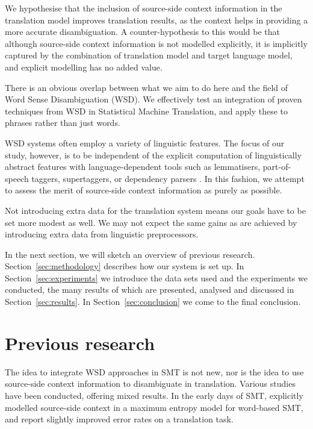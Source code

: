 We hypothesise that the inclusion of source-side context information in the
translation model improves translation results, as the context helps in
providing a more accurate disambiguation. A counter-hypothesis to this would be
that although source-side context information is not modelled explicitly, it is
implicitly captured by the combination of translation model and target language
model, and explicit modelling has no added value.

There is an obvious overlap between what we aim to do here and the field of
Word Sense Disambiguation (WSD). We effectively test an integration of proven
techniques from WSD in Statistical Machine Translation, and apply these to
phrases rather than just words.

WSD systems often employ a variety of linguistic features. The focus of our
study, however, is to be independent of the explicit computation of
linguistically abstract features with language-dependent tools such as
lemmatisers, part-of-speech taggers, supertaggers, or dependency parsers
\cite{Rejwanul+11}. 
In this fashion, we attempt to assess the merit of source-side
context information as purely as possible.

Not introducing extra data for the translation system means our goals have to
be set more modest as well. We may not expect the same gains as are achieved by
introducing extra data from linguistic preprocessors.

In the next section, we will sketch an overview of previous research.
Section~\ref{sec:methodology} describes how our system is set up. In
Section~\ref{sec:experiments} we introduce the data sets used and the
experiments we conducted, the many results of which are presented, analysed and
discussed in Section~\ref{sec:results}. In Section~\ref{sec:conclusion} we come
to the final conclusion.

\section{Previous research}

The idea to integrate WSD approaches in SMT is not new, nor is the idea to use
source-side context information to disambiguate in translation. Various studies
have been conducted, offering mixed results. In the early days of SMT,
\cite{GarciaVarea+02} explicitly modelled source-side context in a
maximum entropy model for word-based SMT, and report slightly improved error
rates on a translation task.

